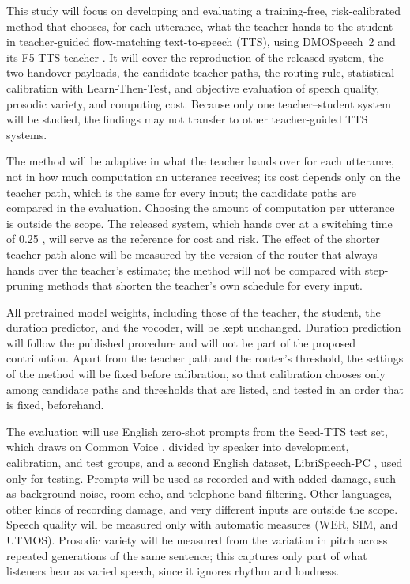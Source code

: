 This study will focus on developing and evaluating a training-free, risk-calibrated method that chooses, for each utterance, what the teacher hands to the student in teacher-guided flow-matching text-to-speech (TTS), using DMOSpeech~2 and its F5-TTS teacher \parencite{li2025dmospeech2}. It will cover the reproduction of the released system, the two handover payloads, the candidate teacher paths, the routing rule, statistical calibration with Learn-Then-Test, and objective evaluation of speech quality, prosodic variety, and computing cost. Because only one teacher--student system will be studied, the findings may not transfer to other teacher-guided TTS systems.

The method will be adaptive in what the teacher hands over for each utterance, not in how much computation an utterance receives; its cost depends only on the teacher path, which is the same for every input; the candidate paths are compared in the evaluation. Choosing the amount of computation per utterance is outside the scope. The released system, which hands over at a switching time of 0.25 \parencite[p.~31819]{li2025dmospeech2}, will serve as the reference for cost and risk. The effect of the shorter teacher path alone will be measured by the version of the router that always hands over the teacher's estimate; the method will not be compared with step-pruning methods that shorten the teacher's own schedule for every input.

All pretrained model weights, including those of the teacher, the student, the duration predictor, and the vocoder, will be kept unchanged. Duration prediction will follow the published procedure and will not be part of the proposed contribution. Apart from the teacher path and the router's threshold, the settings of the method will be fixed before calibration, so that calibration chooses only among candidate paths and thresholds that are listed, and tested in an order that is fixed, beforehand.

The evaluation will use English zero-shot prompts from the Seed-TTS test set, which draws on Common Voice \parencite{anastassiou2024seedtts,ardila2020commonvoice}, divided by speaker into development, calibration, and test groups, and a second English dataset, LibriSpeech-PC \parencite{meister2023librispeechpc}, used only for testing. Prompts will be used as recorded and with added damage, such as background noise, room echo, and telephone-band filtering. Other languages, other kinds of recording damage, and very different inputs are outside the scope. Speech quality will be measured only with automatic measures (WER, SIM, and UTMOS). Prosodic variety will be measured from the variation in pitch across repeated generations of the same sentence; this captures only part of what listeners hear as varied speech, since it ignores rhythm and loudness.

